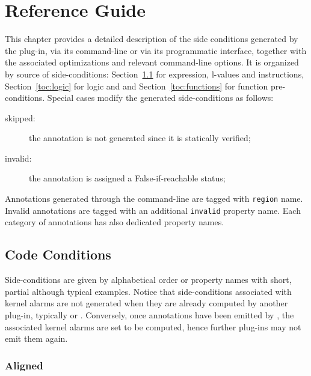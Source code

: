 \chapter{Reference Guide}
\label{toc:reference}

This chapter provides a detailed description of the side conditions generated by
the \Region plug-in, via its command-line or via its programmatic
interface, together with the associated optimizations and relevant command-line
options. It is organized by source of side-conditions: Section~\ref{toc:code}
for expression, l-values and \C instructions, Section~\ref{toc:logic} for logic
and \acsl and Section~\ref{toc:functions} for function pre-conditions.
Special cases modify the generated side-conditions as follows:
\begin{description}
  \item[skipped:] the annotation is not generated since it is statically verified;
  \item[invalid:] the annotation is assigned a False-if-reachable status;
\end{description}

Annotations generated through the command-line are tagged with \verb"region"
name. Invalid annotations are tagged with an additional \verb"invalid" property
name. Each category of annotations has also dedicated property names.

\section{Code Conditions}
\label{toc:code}

Side-conditions are given by alphabetical order or property names with short,
partial although typical examples. Notice that side-conditions associated with
kernel alarms are not generated when they are already computed by another
plug-in, typically \rte or \Eva. Conversely, once annotations
have been emitted by \Region, the associated kernel alarms are set to be
computed, hence further plug-ins may not emit them again.

\subsection{Aligned}

